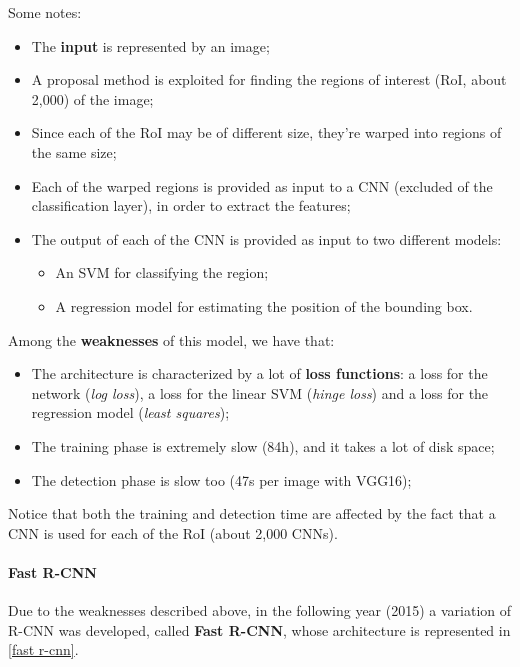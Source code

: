 Some notes:

\begin{itemize}
    \item The \textbf{input} is represented by an image;
    \item A proposal method is exploited for finding the regions of interest (RoI, about 2,000) of the image;
    \item Since each of the RoI may be of different size, they're warped into regions of the same size;
    \item Each of the warped regions is provided as input to a CNN (excluded of the classification layer), in order to extract the features;
    \item The output of each of the CNN is provided as input to two different models:
    \begin{itemize}
        \item An SVM for classifying the region;
        \item A regression model for estimating the position of the bounding box.
    \end{itemize}
\end{itemize}

Among the \textbf{weaknesses} of this model, we have that:

\begin{itemize}
    \item The architecture is characterized by a lot of \textbf{loss functions}: a loss for the network (\textit{log loss}), a loss for the linear SVM (\textit{hinge loss}) and a loss for the regression model (\textit{least squares});
    \item The training phase is extremely slow (84h), and it takes a lot of disk space;
    \item The detection phase is slow too (47s per image with VGG16);
\end{itemize}

Notice that both the training and detection time are affected by the fact that a CNN is used for each of the RoI (about 2,000 CNNs).

\paragraph{Fast R-CNN}
Due to the weaknesses described above, in the following year (2015) a variation of R-CNN was developed, called \textbf{Fast R-CNN}, whose architecture is represented in \ref{fast r-cnn}.

